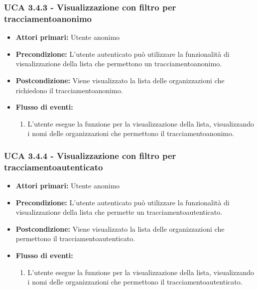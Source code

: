 \subsubsection{UCA 3.4.3 - Visualizzazione con filtro per tracciamentoanonimo}%
\begin{itemize}
	\item \textbf{Attori primari:} Utente anonimo
	\item \textbf{Precondizione:} L'utente autenticato può utilizzare la funzionalità di visualizzazione della lista che permettono un tracciamentoanonimo.
	\item \textbf{Postcondizione:} Viene visualizzato la lista delle organizzazioni che richiedono il tracciamentoanonimo.
	\item \textbf{Flusso di eventi:}
		\begin{enumerate}
		\item L'utente esegue la funzione per la visualizzazione della lista, visualizzando i nomi delle organizzazioni che permettono il tracciamentoanonimo.
	\end{enumerate}
\end{itemize}

\subsubsection{UCA 3.4.4 - Visualizzazione con filtro per tracciamentoautenticato}%
\begin{itemize}
	\item \textbf{Attori primari:} Utente anonimo
	\item \textbf{Precondizione:} L'utente autenticato può utilizzare la funzionalità di visualizzazione della lista che permette un tracciamentoautenticato.
	\item \textbf{Postcondizione:} Viene visualizzato la lista delle organizzazioni che permettono il tracciamentoautenticato.
	\item \textbf{Flusso di eventi:}
	\begin{enumerate}
		\item L'utente esegue la funzione per la visualizzazione della lista, visualizzando i nomi delle organizzazioni che permettono il tracciamentoautenticato.
	\end{enumerate}
\end{itemize}

